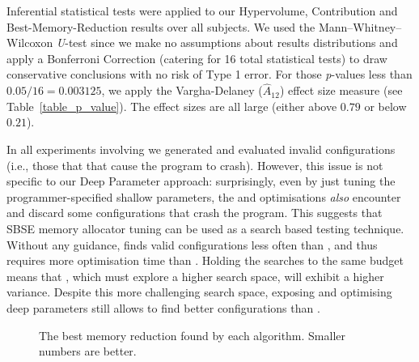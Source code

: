 Inferential statistical tests were applied to our Hypervolume, Contribution and Best-Memory-Reduction results over all subjects.
We used the Mann–Whitney–Wilcoxon \emph{U}-test since we make no assumptions about results distributions and apply a Bonferroni Correction (catering for 16 total statistical tests) to draw conservative conclusions with no risk of Type 1 error.
For those \emph{p}-values less than $0.05/16=0.003125$, we apply the
Vargha-Delaney ($\hat{A}_{12}$) effect size measure (see Table~\ref{table_p_value}).
The effect sizes are all large (either above $0.79$ or below $0.21$).

In all experiments involving \dr{} we generated and evaluated invalid
configurations (i.e., those that that cause the program to crash). However,
this issue is not specific to our Deep Parameter approach: 
surprisingly, even by just tuning the programmer-specified shallow parameters, 
the \sr{} and \sn{} optimisations {\em also} encounter and discard some
configurations that crash the program.
This suggests that SBSE memory allocator tuning can be used as a search based testing technique.
Without any guidance, \dr{}
finds valid configurations less often than \sr{}, and thus requires more
optimisation time than \sr{}. Holding the searches to the same budget means
that \dn{}, which must explore a higher search space, will exhibit a higher
variance. 
Despite this more challenging search space, exposing and optimising deep
parameters still allows \dn{} to find better configurations
than \sn{}.

\begin{figure}[htb]
	\centering
	\vspace{-1.2em}
	\caption{The best memory reduction found by each algorithm. Smaller numbers are better.}\label{fig_best_memory}
\end{figure}

